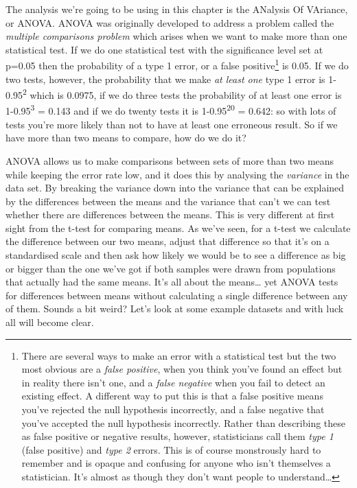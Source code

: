 \documentclass[
]{book}
\begin{document}
The analysis we're going to be using in this chapter is the ANalysis Of VAriance, or ANOVA. ANOVA was originally developed to address a problem called the \emph{multiple comparisons problem} which arises when we want to make more than one statistical test. If we do one statistical test with the significance level set at p=0.05 then the probability of a type 1 error, or a false positive\footnote{There are several ways to make an error with a statistical test but the two most obvious are a \emph{false positive}, when you think you've found an effect but in reality there isn't one, and a \emph{false negative} when you fail to detect an existing effect. A different way to put this is that a false positive means you've rejected the null hypothesis incorrectly, and a false negative that you've accepted the null hypothesis incorrectly. Rather than describing these as false positive or negative results, however, statisticians call them \emph{type 1} (false positive) and \emph{type 2} errors. This is of course monstrously hard to remember and is opaque and confusing for anyone who isn't themselves a statistician. It's almost as though they don't want people to understand\ldots{}} is 0.05. If we do two tests, however, the probability that we make \emph{at least one} type 1 error is 1-0.95\textsuperscript{2} which is 0.0975, if we do three tests the probability of at least one error is 1-0.95\textsuperscript{3} = 0.143 and if we do twenty tests it is 1-0.95\textsuperscript{20} = 0.642: so with lots of tests you're more likely than not to have at least one erroneous result. So if we have more than two means to compare, how do we do it?

ANOVA allows us to make comparisons between sets of more than two means while keeping the error rate low, and it does this by analysing the \emph{variance} in the data set. By breaking the variance down into the variance that can be explained by the differences between the means and the variance that can't we can test whether there are differences between the means. This is very different at first sight from the t-test for comparing means. As we've seen, for a t-test we calculate the difference between our two means, adjust that difference so that it's on a standardised scale and then ask how likely we would be to see a difference as big or bigger than the one we've got if both samples were drawn from populations that actually had the same means. It's all about the means\ldots{} yet ANOVA tests for differences between means without calculating a single difference between any of them. Sounds a bit weird? Let's look at some example datasets and with luck all will become clear.
\end{document}
